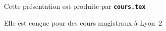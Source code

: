   \item Cette présentation est produite par \texttt{\textbf{cours.tex}}
  \item Elle est conçue pour des cours magistraux à Lyon~2
